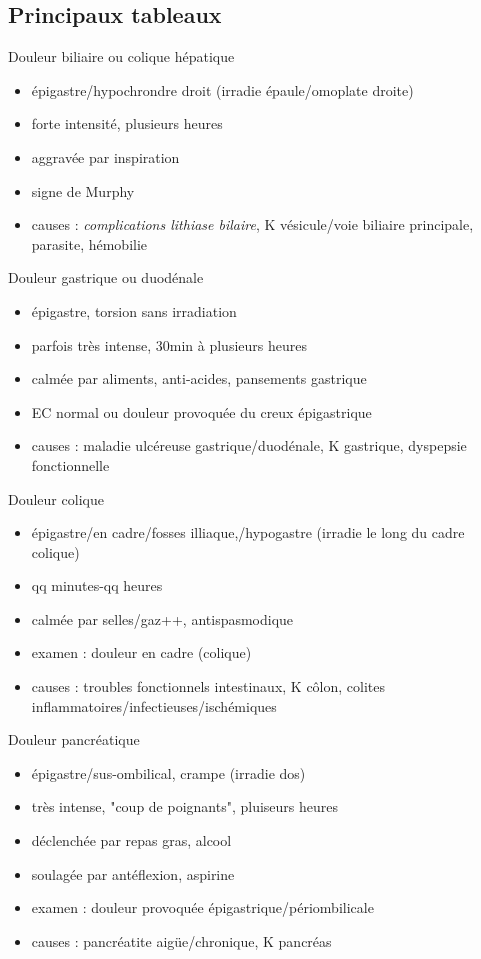 \documentclass[11pt]{article}
\begin{document}
\subsection{Principaux tableaux}
\label{sec:org01a622d}
Douleur biliaire ou colique hépatique
\begin{itemize}
\item épigastre/hypochrondre droit (irradie épaule/omoplate droite)
\item forte intensité, plusieurs heures
\item aggravée par inspiration
\item signe de Murphy
\item causes : \emph{complications lithiase bilaire}, K vésicule/voie biliaire
principale, parasite, hémobilie
\end{itemize}
Douleur gastrique ou duodénale
\begin{itemize}
\item épigastre, torsion sans irradiation
\item parfois très intense, 30min à plusieurs heures
\item calmée par aliments, anti-acides, pansements gastrique
\item EC normal ou douleur provoquée du creux épigastrique
\item causes : maladie ulcéreuse gastrique/duodénale, K gastrique, dyspepsie fonctionnelle
\end{itemize}
Douleur colique
\begin{itemize}
\item épigastre/en cadre/fosses illiaque,/hypogastre (irradie le long du cadre
colique)
\item qq minutes-qq heures
\item calmée par selles/gaz++, antispasmodique
\item examen : douleur en cadre (colique)
\item causes : troubles fonctionnels intestinaux, K côlon, colites
inflammatoires/infectieuses/ischémiques
\end{itemize}
Douleur pancréatique
\begin{itemize}
\item épigastre/sus-ombilical, crampe (irradie dos)
\item très intense, "coup de poignants", pluiseurs heures
\item déclenchée par repas gras, alcool
\item soulagée par antéflexion, aspirine
\item examen : douleur provoquée épigastrique/périombilicale
\item causes : pancréatite aigüe/chronique, K pancréas
\end{itemize}
\end{document}
